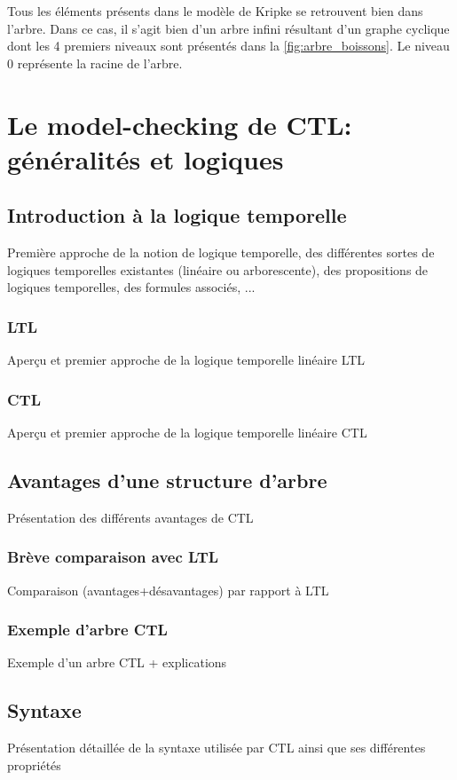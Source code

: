 \documentclass[runningheads,a4paper,10pt]{llncs}
\begin{document}
Tous les éléments présents dans le modèle de Kripke se retrouvent bien dans l'arbre. Dans ce cas, il s'agit bien d'un arbre infini résultant d'un graphe cyclique dont les 4 premiers niveaux sont présentés dans la \autoref{fig:arbre_boissons}. Le niveau 0 représente la racine de l'arbre.    

 
\section{Le model-checking de CTL: généralités et logiques}

\subsection{Introduction à la logique temporelle}
Première approche de la notion de logique temporelle, des différentes sortes de logiques temporelles existantes (linéaire ou arborescente), des propositions de logiques temporelles, des formules associés, ... 

\subsubsection{LTL}
Aperçu et premier approche de la logique temporelle linéaire LTL 

\subsubsection{CTL}
Aperçu et premier approche de la logique temporelle linéaire CTL 

\subsection{Avantages d'une structure d'arbre}
Présentation des différents avantages de CTL

\subsubsection{Brève comparaison avec LTL}
Comparaison (avantages+désavantages) par rapport à LTL 

\subsubsection{Exemple d'arbre CTL}
Exemple d'un arbre CTL + explications

\subsection{Syntaxe}
Présentation détaillée de la syntaxe utilisée par CTL ainsi que ses différentes propriétés 
\end{document}
